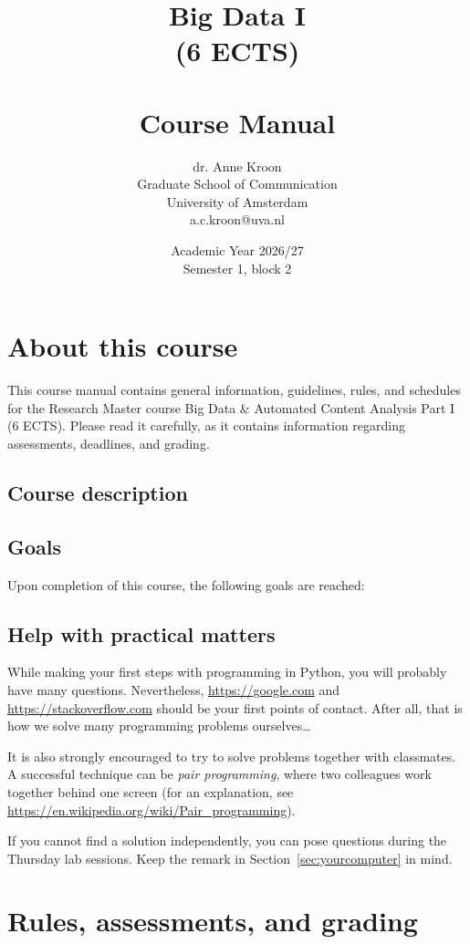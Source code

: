 \documentclass[a4paper,10pt,twocolumn]{report}
\title{Big Data I\\ (6 ECTS)\\~\\Course Manual}
\author{
    dr. Anne Kroon\\
    Graduate School of Communication\\
    University of Amsterdam\\
    a.c.kroon@uva.nl}
\date{Academic Year 2026/27\\Semester 1, block 2}
\begin{document}
\maketitle

\chapter{About this course}

This course manual contains general information, guidelines, rules, and schedules for the Research Master course Big Data \& Automated Content Analysis Part I (6 ECTS). Please read it carefully, as it contains information regarding assessments, deadlines, and grading.

\section{Course description}


\section{Goals}

Upon completion of this course, the following goals are reached:



\section{Help with practical matters}

While making your first steps with programming in Python, you will probably have many questions. Nevertheless, \url{https://google.com} and \url{https://stackoverflow.com} should be your first points of contact. After all, that is how we solve many programming problems ourselves\ldots

It is also strongly encouraged to try to solve problems together with classmates. A successful technique can be \emph{pair programming}, where two colleagues work together behind one screen (for an explanation, see \url{https://en.wikipedia.org/wiki/Pair_programming}).

If you cannot find a solution independently, you can pose questions during the Thursday lab sessions. Keep the remark in Section~\ref{sec:yourcomputer} in mind.

\chapter{Rules, assessments, and grading}

\end{document}
